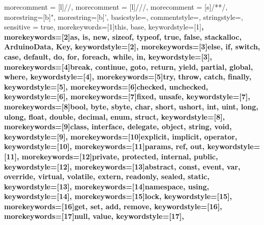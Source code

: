 \usepackage{courier, color, listings}

{
 morecomment = [l]{//}, 
 morecomment = [l]{///},
 morecomment = [s]{/*}{*/},
 morestring=[b]", 
 morestring=[b]',
 basicstyle=\footnotesize\ttfamily,
 commentstyle=\color{Green}\textit,
 stringstyle=\color{blue},
 sensitive = true,
  morekeywords=[1]{this, base},
  keywordstyle=[1]\bfseries,
  morekeywords=[2]{as, is, new, sizeof, typeof, true, false, stackalloc, ArduinoData, Key},
  keywordstyle=[2]\color{DarkCyan}\bfseries,
  morekeywords=[3]{else, if, switch, case, default,
  do, for, foreach, while, in},
  keywordstyle=[3]\color{blue}\bfseries ,
  morekeywords=[4]{break, continue, goto, return,
  yield, partial, global, where},
  keywordstyle=[4]\color{Navy},
  morekeywords=[5]{try, throw, catch, finally},
  keywordstyle=[5]\color{Teal}\bfseries,
  morekeywords=[6]{checked, unchecked},
  keywordstyle=[6]\color{DarkGray}\bfseries,
  morekeywords=[7]{fixed, unsafe},
  keywordstyle=[7]\color{Olive},
  morekeywords=[8]{bool, byte, sbyte, char, short, ushort, int, uint, long, ulong, float,
  double, decimal, enum, struct},
  keywordstyle=[8]\bfseries\color{blue},
  morekeywords=[9]{class, interface, delegate, object, string,
  void},
  keywordstyle=[9]\color{red},
  morekeywords=[10]{explicit, implicit, operator},
  keywordstyle=[10]\color{Pink}\bfseries,
  morekeywords=[11]{params, ref, out},
  keywordstyle=[11]\bfseries\color{DeepPink},
  morekeywords=[12]{private, protected, internal, public},
  keywordstyle=[12]\bfseries\color{blue},
  morekeywords=[13]{abstract, const, event, var, override, virtual, volatile, extern, readonly, sealed, static},
  keywordstyle=[13]\color{Brown},
  morekeywords=[14]{namespace, using},
  keywordstyle=[14]\bfseries\color{Green},
  morekeywords=[15]{lock},
  keywordstyle=[15]\color{DarkViolet},
  morekeywords=[16]{get, set, add, remove},
  keywordstyle=[16]\color{SaddleBrown},
  morekeywords=[17]{null, value},
  keywordstyle=[17]\bfseries,
}
\lstset{tabsize=4,showstringspaces=false, numberstyle=\tiny, stepnumber=2, numbersep=5pt}